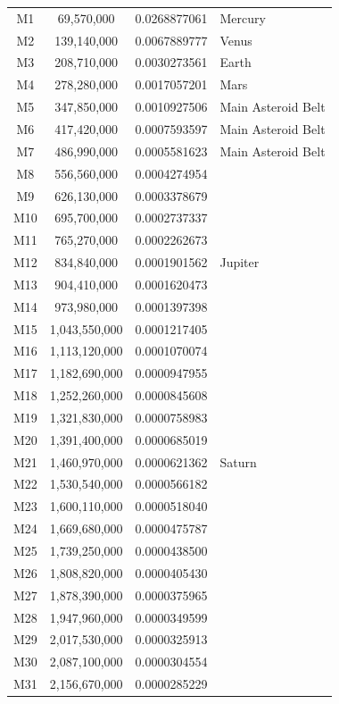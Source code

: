 \documentclass[11pt, a4paper]{article}
\begin{document}
\begin{longtable}{@{} c c c l @{}}
  M1 & 69,570,000 & 0.0268877061 & Mercury \\
  M2 & 139,140,000 & 0.0067889777 & Venus \\
  M3 & 208,710,000 & 0.0030273561 & Earth \\
  M4 & 278,280,000 & 0.0017057201 & Mars \\
  M5 & 347,850,000 & 0.0010927506 & Main Asteroid Belt \\
  M6 & 417,420,000 & 0.0007593597 & Main Asteroid Belt \\
  M7 & 486,990,000 & 0.0005581623 & Main Asteroid Belt \\
  M8 & 556,560,000 & 0.0004274954 &  \\
  M9 & 626,130,000 & 0.0003378679 &  \\
  M10 & 695,700,000 & 0.0002737337 &  \\
  M11 & 765,270,000 & 0.0002262673 &  \\
  M12 & 834,840,000 & 0.0001901562 & Jupiter \\
  M13 & 904,410,000 & 0.0001620473 &  \\
  M14 & 973,980,000 & 0.0001397398 &  \\
  M15 & 1,043,550,000 & 0.0001217405 &  \\
  M16 & 1,113,120,000 & 0.0001070074 &  \\
  M17 & 1,182,690,000 & 0.0000947955 &  \\
  M18 & 1,252,260,000 & 0.0000845608 &  \\
  M19 & 1,321,830,000 & 0.0000758983 &  \\
  M20 & 1,391,400,000 & 0.0000685019 &  \\
  M21 & 1,460,970,000 & 0.0000621362 & Saturn \\
  M22 & 1,530,540,000 & 0.0000566182 &  \\
  M23 & 1,600,110,000 & 0.0000518040 &  \\
  M24 & 1,669,680,000 & 0.0000475787 &  \\
  M25 & 1,739,250,000 & 0.0000438500 &  \\
  M26 & 1,808,820,000 & 0.0000405430 &  \\
  M27 & 1,878,390,000 & 0.0000375965 &  \\
  M28 & 1,947,960,000 & 0.0000349599 &  \\
  M29 & 2,017,530,000 & 0.0000325913 &  \\
  M30 & 2,087,100,000 & 0.0000304554 &  \\
  M31 & 2,156,670,000 & 0.0000285229 &  \\

\end{longtable}
\end{document}
